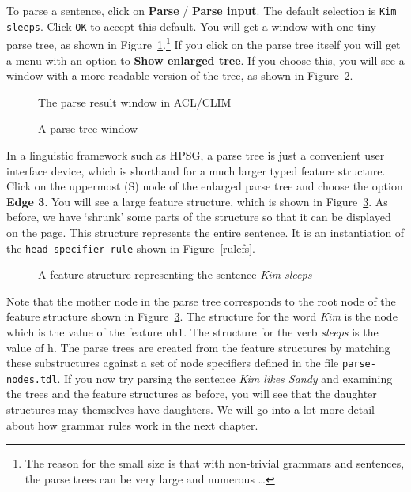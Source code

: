 \documentclass[12pt]{report}
\begin{document}
To parse a sentence, click on {\bf Parse} / {\bf Parse input}.
The default selection is {\tt Kim sleeps}.  Click {\tt OK} to
accept this default. You will get a window with one tiny parse
tree, as shown in Figure~\ref{kimsleeps}.\footnote{The reason for the
small size is that with non-trivial grammars and sentences, the parse 
trees can be very large and numerous \ldots} If you click on the parse
tree itself you will get a menu with an option to {\bf Show enlarged tree}.
If you choose this, you will see a window with a more readable version
of the tree, as shown in Figure~\ref{ptree}.
\begin{figure}
\epsfxsize=2in
\caption{The parse result window in ACL/CLIM}
\label{kimsleeps}
\end{figure}
\begin{figure}
\epsfxsize=2in
\caption{A parse tree window}
\label{ptree}
\end{figure}

In a linguistic framework such as HPSG, a parse tree is just a convenient
user interface device, which is shorthand for a much larger typed
feature structure.  Click on the uppermost (S) node of the
enlarged parse tree and choose the option {\bf Edge 3}.  You will
see a large feature structure, which is shown in Figure~\ref{bigfs}.
As before, we have `shrunk' some parts of the structure so that
it can be displayed on the page.
This structure represents the entire
sentence.  It is an instantiation of the {\tt head-specifier-rule}
shown in Figure~\ref{rulefs}.
\begin{figure}
\epsfxsize=4in
\caption{A feature structure representing the sentence {\it Kim sleeps}}
\label{bigfs}
\end{figure}

Note that the mother node in the parse tree corresponds
to the root node of the feature structure shown in Figure~\ref{bigfs}.
The structure for the word {\it Kim} is the node which
is the value of the feature {\sc nh1}.  The structure for the
verb {\it sleeps} is the value of {\sc h}.
The parse trees are created from the feature structures
by matching these substructures against a set of node specifiers
defined in the file {\tt parse-nodes.tdl}.
If you now try parsing the sentence {\it Kim likes Sandy}
and examining the trees and the feature structures as before, you
will see that the daughter structures may themselves have daughters.
We will go into a lot more detail about how grammar rules work
in the next chapter.
\end{document}
